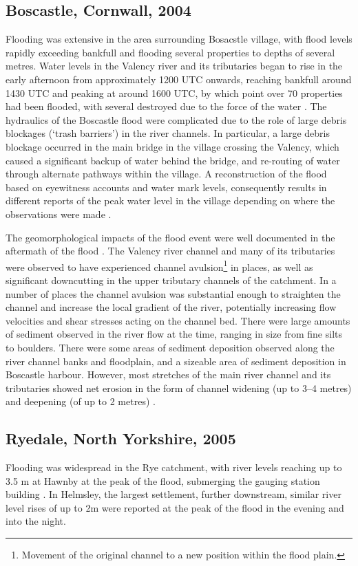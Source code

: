 \subsection{Boscastle, Cornwall, 2004}
Flooding was extensive in the area surrounding Bosacstle village, with flood levels rapidly exceeding bankfull and flooding several properties to depths of several metres. Water levels in the Valency river and its tributaries began to rise in the early afternoon from approximately 1200 UTC onwards, reaching bankfull around 1430 UTC and peaking at around 1600 UTC, by which point over 70 properties had been flooded, with several destroyed due to the force of the water \citep{wallingford2005flooding}.
The hydraulics of the Boscastle flood were complicated due to the role of large debris blockages (`trash barriers') in the river channels. In particular, a large debris blockage occurred in the main bridge in the village crossing the Valency, which caused a significant backup of water behind the bridge, and re-routing of water through alternate pathways within the village. A reconstruction of the flood based on eyewitness accounts and water mark levels, consequently results in different reports of the peak water level in the village depending on where the observations were made \citep{wallingford2005flooding}. 

The geomorphological impacts of the flood event were well documented in the aftermath of the flood \citep{wallingford2005flooding}. The Valency river channel and many of its tributaries were observed to have experienced channel avulsion\footnote{Movement of the original channel to a new position within the flood plain.} in places, as well as significant downcutting in the upper tributary channels of the catchment. In a number of places the channel avulsion was substantial enough to straighten the channel and increase the local gradient of the river, potentially increasing flow velocities and shear stresses acting on the channel bed. There were large amounts of sediment observed in the river flow at the time, ranging in size from fine silts to boulders. There were some areas of sediment deposition observed along the river channel banks and floodplain, and a sizeable area of sediment deposition in Boscastle harbour. However, most stretches of the main river channel and its tributaries showed net erosion in the form of channel widening (up to 3--4 metres) and deepening (of up to 2 metres) \citep{wallingford2005flooding}.

\subsection{Ryedale, North Yorkshire, 2005}
Flooding was widespread in the Rye catchment, with river levels reaching up to 3.5 m at Hawnby at the peak of the flood, submerging the gauging station building \citep{wass2008investigation}. In Helmsley, the largest settlement, further downstream, similar river level rises of up to 2m were reported at the peak of the flood in the evening and into the night. 

